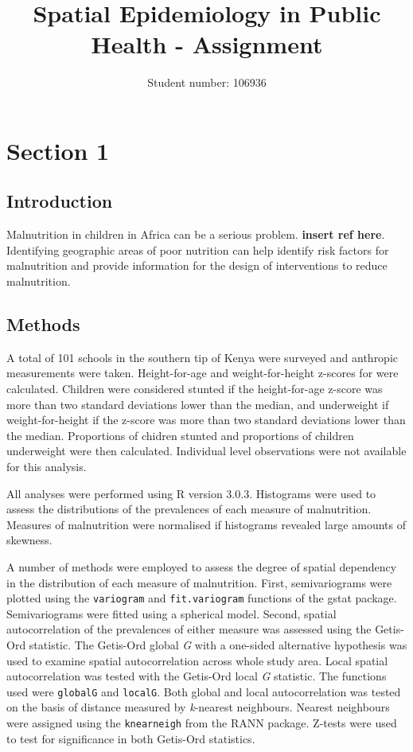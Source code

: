 \documentclass[11pt,a4paper,twoside]{article}\usepackage[]{graphicx}\usepackage[]{color}
\title{Spatial Epidemiology in Public Health - Assignment}
\author{Student number: 106936}
\begin{document}
\section*{Section 1}
\subsection*{Introduction}
Malnutrition in children in Africa can be a serious problem. \textbf{insert ref here}. 
Identifying geographic areas of poor nutrition can help identify risk factors for malnutrition and provide information for the design of interventions to reduce malnutrition. 

\subsection*{Methods}
A total of 101 schools in the southern tip of Kenya were surveyed and anthropic measurements were taken. 
Height-for-age and weight-for-height z-scores for were calculated. 
Children were considered stunted if the height-for-age z-score was more than two standard deviations lower than the median, and underweight if weight-for-height if the z-score was more than two standard deviations lower than the median. 
Proportions of chidren stunted and proportions of children underweight were then calculated. 
Individual level observations were not available for this analysis. 

All analyses were performed using R version 3.0.3.
Histograms were used to assess the distributions of the prevalences of each measure of malnutrition. 
Measures of malnutrition were normalised if histograms revealed large amounts of skewness. 

A number of methods were employed to assess the degree of spatial dependency in the distribution of each measure of malnutrition.
First, semivariograms were plotted using the \texttt{variogram} and \texttt{fit.variogram} functions of the gstat package. 
Semivariograms were fitted using a spherical model. 
Second, spatial autocorrelation of the prevalences of either measure was assessed using the Getis-Ord statistic. 
The Getis-Ord global \textit{G} with a one-sided alternative hypothesis was used to examine spatial autocorrelation across whole study area. 
Local spatial autocorrelation was tested with the Getis-Ord local \textit{G} statistic.
The functions used were \texttt{globalG} and \texttt{localG}.
Both global and local autocorrelation was tested on the basis of distance measured by \textit{k}-nearest neighbours. 
Nearest neighbours were assigned using the \texttt{knearneigh} from the RANN package. 
Z-tests were used to test for significance in both Getis-Ord statistics. 
\end{document}
